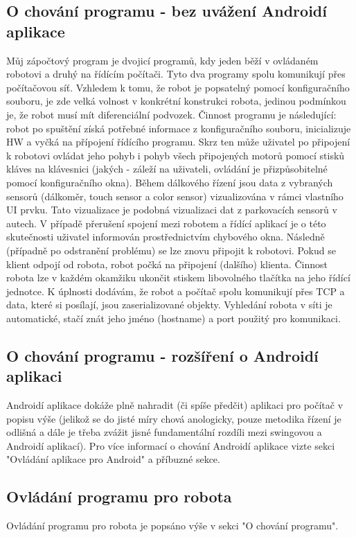\documentclass[12pt, ngerman]{article}
\begin{document}
\subsection{O chování programu - bez uvážení Androidí aplikace}
Můj zápočtový program je dvojicí programů, kdy jeden běží v ovládaném robotovi a druhý na řídícím počítači. Tyto dva programy spolu komunikují přes počítačovou síť. Vzhledem k tomu, že robot je popsatelný pomocí konfiguračního souboru, je zde velká volnost v konkrétní konstrukci robota, jedinou podmínkou je, že robot musí mít diferenciální podvozek. Činnost programu je následující: robot po spuštění získá potřebné informace z konfiguračního souboru, inicializuje HW a vyčká na přípojení řídícího programu. Skrz ten může uživatel po připojení k robotovi ovládat jeho pohyb i pohyb všech připojených motorů pomocí stisků kláves na klávesnici (jakých - záleží na uživateli, ovládání je přizpůsobitelné pomocí konfiguračního okna). Během dálkového řízení jsou data z vybraných sensorů (dálkoměr, touch sensor a color sensor) vizualizována v rámci vlastního UI prvku. Tato vizualizace je podobná vizualizaci dat z parkovacích sensorů v autech. V případě přerušení spojení mezi robotem a řídící aplikací je o této skutečnosti uživatel informován prostřednictvím chybového okna. Následně (případně po odstranění problému) se lze znovu připojit k robotovi. Pokud se klient odpojí od robota, robot počká na připojení (dalšího) klienta. Činnost robota lze v každém okamžiku ukončit stiskem libovolného tlačítka na jeho řídící jednotce. K úplnosti dodávám, že robot a počítač spolu komunikují přes TCP a data, které si posílají, jsou zaserializované objekty. Vyhledání robota v síti je automatické, stačí znát jeho jméno (hostname) a port použitý pro komunikaci.

\subsection{O chování programu - rozšíření o Androidí aplikaci}
Androidí aplikace dokáže plně nahradit (či spíše předčit) aplikaci pro počítač v popisu výše (jelikož se do jisté míry chová anologicky, pouze metodika řízení je odlišná a dále je třeba zvážit jisné fundamentální rozdíli mezi swingovou a Androidí aplikací). Pro více informací o chování Androidí aplikace vizte sekci  "Ovládání aplikace pro Android" a příbuzné sekce.

\subsection{Ovládání programu pro robota}
Ovládání programu pro robota je popsáno výše v sekci "O chování programu".
\end{document}
